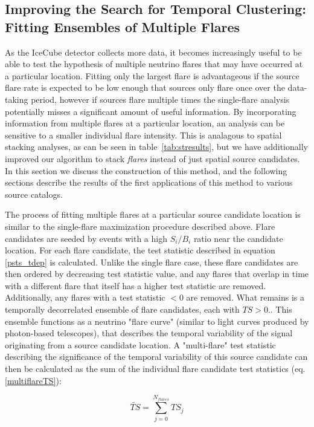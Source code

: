 \subsection{Improving the Search for Temporal Clustering: Fitting Ensembles of Multiple Flares}
As the IceCube detector collects more data, it becomes increasingly useful to be able to test the hypothesis of multiple neutrino flares that may have occurred at a particular location. Fitting only the largest flare is advantageous if the source flare rate is expected to be low enough that sources only flare once over the data-taking period, however if sources flare multiple times the single-flare analysis potentially misses a significant amount of useful information. \color{red}By incorporating information from multiple flares at a particular location, an analysis can be sensitive to a smaller individual flare intensity. This is analagous to spatial stacking analyses, as can be seen in table~\ref{tab:stresults}, but we have additionally improved our algorithm to stack \textit{flares} instead of just spatial source candidates. In this section we discuss the construction of this method, and the following sections describe the results of the first applications of this method to various source catalogs. \color{black}

The process of fitting multiple flares at a particular source candidate location is similar to the single-flare maximization procedure described above. Flare candidates are seeded by events with a high $S_i/B_i$ ratio near the candidate location. For each flare candidate, the test statistic described in equation \ref{psts_tdep} is calculated. Unlike the single flare case, these flare candidates are then ordered by decreasing test statistic value, and any flares that overlap in time with a different flare that itself has a higher test statistic are removed. Additionally, any flares with a test statistic $< 0$ are removed. What remains is a temporally decorrelated ensemble of flare candidates, each with $TS>0.$. This ensemble functions as a neutrino "flare curve" (similar to light curves produced by photon-based telescopes), that describes the temporal variability of the signal originating from a source candidate location. A "multi-flare" test statistic describing the significance of the temporal variability of this source candidate can then be calculated as the sum of the individual flare candidate test statistics (eq. \ref{multiflareTS}):

\begin{equation}
    \widetilde{TS} = \sum_{j=0}^{N_{flares}} TS_{j}
    \label{multiflareTS}
\end{equation}


